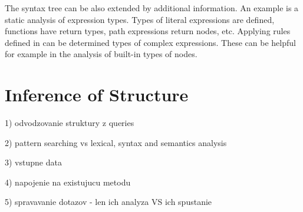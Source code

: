 The syntax tree can be also extended by additional information. An example is a static analysis of expression types. Types of literal expressions are defined, functions have return types, path expressions return nodes, etc. Applying rules defined in  can be determined types of complex expressions. These can be helpful for example in the analysis of built-in types of nodes.  


\section{Inference of Structure}

1) odvodzovanie struktury z queries

2) pattern searching vs lexical, syntax and semantics analysis

3) vstupne data

4) napojenie na existujucu metodu

5) spravavanie dotazov - len ich analyza VS ich spustanie